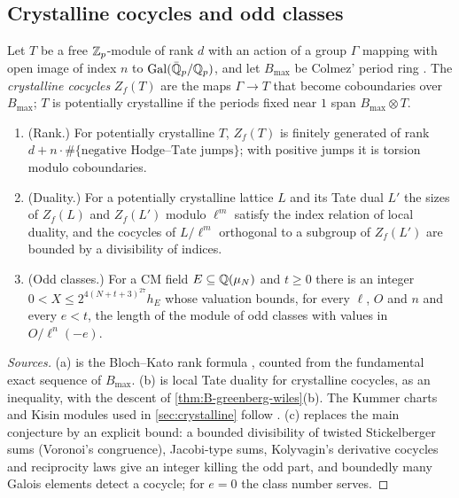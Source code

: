 \subsection{Crystalline cocycles and odd classes}\label{ss:B-padic}
Let $T$ be a free $\mathbb{Z}_p$-module of rank $d$ with an action of a group $\Gamma$ mapping with open image of index $n$ to $\operatorname{Gal}(\bar{\mathbb{Q}}_p/\mathbb{Q}_p)$, and let $B_{\max}$ be Colmez' period ring \cite{Colmez1998}. The \emph{crystalline cocycles}
$Z_f(T)$ are the maps $\Gamma\to T$ that become coboundaries over $B_{\max}$; $T$ is potentially crystalline if the periods fixed near $1$ span $B_{\max}\otimes T$.

\begin{theorem}\label{thm:B-padic}
\begin{enumerate}[label=\textup{(\alph*)}]
\item (Rank.) For potentially crystalline $T$, $Z_f(T)$ is finitely generated of rank $d+n\cdot\#\{\text{negative Hodge--Tate jumps}\}$; with positive jumps it is torsion modulo coboundaries.
\item (Duality.) For a potentially crystalline lattice $L$ and its Tate dual $L'$ the sizes of $Z_f(L)$ and $Z_f(L')$ modulo $\ell^m$ satisfy the index relation of local duality, and the cocycles of $L/\ell^m$ orthogonal to a subgroup of
$Z_f(L')$ are bounded by a divisibility of indices.
\item (Odd classes.) For a CM field $E\subseteq\mathbb{Q}(\mu_N)$ and $t\ge0$ there is an integer $0<X\le2^{4(N+t+3)^{27}}h_E$ whose valuation bounds, for every $\ell$, $O$ and $n$ and every $e<t$, the length of the module of odd classes with
values in $O/\ell^n(-e)$.
\end{enumerate}
\end{theorem}

\begin{proof}[Sources]
(a) is the Bloch--Kato rank formula \cite[Prop.~3.8, Cor.~3.8.4]{BlochKato1990}, counted from the fundamental exact sequence of $B_{\max}$. (b) is local Tate duality for crystalline cocycles, as an inequality,
with the descent of \cref{thm:B-greenberg-wiles}(b). The Kummer charts and Kisin modules used in \cref{sec:crystalline} follow \cite{Kisin2006}. (c) replaces the main conjecture \cite{Wiles1990} by an
explicit bound: a bounded divisibility of twisted Stickelberger sums (Voronoi's congruence), Jacobi-type sums, Kolyvagin's derivative cocycles and reciprocity laws give an integer killing the odd part, and
boundedly many Galois elements detect a cocycle; for $e=0$ the class number serves.
\end{proof}

